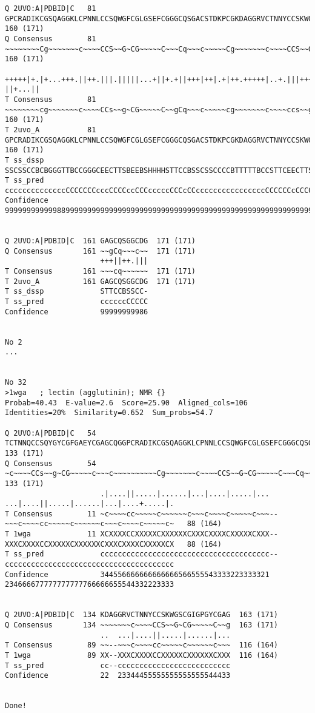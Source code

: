 \begin{verbatim}
Q 2UVO:A|PDBID|C   81 GPCRADIKCGSQAGGKLCPNNLCCSQWGFCGLGSEFCGGGCQSGACSTDKPCGKDAGGRVCTNNYCCSKWGSCGIGPGYC  160 (171)
Q Consensus        81 ~~~~~~~~Cg~~~~~~~c~~~~CCS~~G~CG~~~~~C~~~Cq~~~c~~~~~Cg~~~~~~~c~~~~CCS~~G~CG~~~~~C  160 (171)
                      +++++|+.|+...+++.||++.|||.|||||...+||+.+||+++|++|.+|++.+++++|..+.|||+++-||+...||
T Consensus        81 ~~~~~~~~cg~~~~~~~c~~~~CCs~~g~CG~~~~~C~~gCq~~~c~~~~~cg~~~~~~~c~~~~ccs~~g~Cg~~~~~C  160 (171)
T 2uvo_A           81 GPCRADIKCGSQAGGKLCPNNLCCSQWGFCGLGSEFCGGGCQSGACSTDKPCGKDAGGRVCTNNYCCSKWGSCGIGPGYC  160 (171)
T ss_dssp             SSCSSCCBCBGGGTTBCCGGGCEECTTSBEEBSHHHHSTTCCBSSCSSCCCCBTTTTTBCCSTTCEECTTSCEEBSHHHH
T ss_pred             ccccccccccccccCCCCCCCcccCCCCccCCCcccccCCCcCCccccccccccccccccCCCCCCcCCCCEecCchhhc
Confidence            99999999999988999999999999999999999999999999999999999999999999999999999999999999


Q 2UVO:A|PDBID|C  161 GAGCQSGGCDG  171 (171)
Q Consensus       161 ~~gCq~~~c~~  171 (171)
                      +++||++.|||
T Consensus       161 ~~~cq~~~~~~  171 (171)
T 2uvo_A          161 GAGCQSGGCDG  171 (171)
T ss_dssp             STTCCBSSCC-
T ss_pred             ccccccCCCCC
Confidence            99999999986


No 2
...


No 32
>1wga   ; lectin (agglutinin); NMR {}
Probab=40.43  E-value=2.6  Score=25.90  Aligned_cols=106  Identities=20%  Similarity=0.652  Sum_probs=54.7

Q 2UVO:A|PDBID|C   54 TCTNNQCCSQYGYCGFGAEYCGAGCQGGPCRADIKCGSQAGGKLCPNNLCCSQWGFCGLGSEFCGGGCQSGACSTDKPCG  133 (171)
Q Consensus        54 ~c~~~~CCs~~g~CG~~~~~c~~~c~~~~~~~~~~Cg~~~~~~~c~~~~CCS~~G~CG~~~~~C~~~Cq~~~c~~~~~Cg  133 (171)
                      .|....||.....|......|...|....|.....|...  ...|....||.....|......|...|....+.....|.
T Consensus        11 ~c~~~~cc~~~~~c~~~~~~c~~~c~~~~c~~~~~c~~~--~~~c~~~~cc~~~~~c~~~~~~c~~~c~~~~c~~~~~c~   88 (164)
T 1wga             11 XCXXXXCCXXXXXCXXXXXXCXXXCXXXXCXXXXXCXXX--XXXCXXXXCCXXXXXCXXXXXXCXXXCXXXXCXXXXXCX   88 (164)
T ss_pred             ccccccccccccccccccccccccccccccccccccccc--ccccccccccccccccccccccccccccccccccccccc
Confidence            344556666666666666566555543333223333321  234666677777777777766666655544332223333


Q 2UVO:A|PDBID|C  134 KDAGGRVCTNNYCCSKWGSCGIGPGYCGAG  163 (171)
Q Consensus       134 ~~~~~~~c~~~~CCS~~G~CG~~~~~C~~g  163 (171)
                      ..  ...|....||.....|......|...
T Consensus        89 ~~--~~~c~~~~cc~~~~~c~~~~~~c~~~  116 (164)
T 1wga             89 XX--XXXCXXXXCCXXXXXCXXXXXXCXXX  116 (164)
T ss_pred             cc--cccccccccccccccccccccccccc
Confidence            22  23344455555555555555544433


Done!
\end{verbatim}

